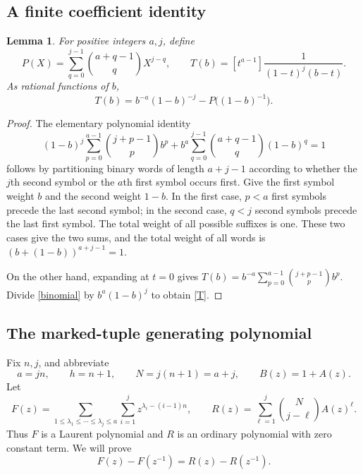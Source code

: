 \documentclass[11pt]{article}
\newtheorem{lemma}{Lemma}
\begin{document}
\subsection*{A finite coefficient identity}
\begin{lemma}\label{truncation}
For positive integers $a,j$, define
\[
 P(X)=\sum_{q=0}^{j-1}\binom{a+q-1}q X^{j-q},\qquad
 T(b)=[t^{a-1}]\frac1{(1-t)^j(b-t)}.
\]
As rational functions of $b$,
\begin{equation}\label{T}
 T(b)=b^{-a}(1-b)^{-j}-P\bigl((1-b)^{-1}\bigr).
\end{equation}
\end{lemma}
\begin{proof}
The elementary polynomial identity
\begin{equation}\label{binomial}
 (1-b)^j\sum_{p=0}^{a-1}\binom{j+p-1}p b^p
 +b^a\sum_{q=0}^{j-1}\binom{a+q-1}q(1-b)^q=1
\end{equation}
follows by partitioning binary words of length $a+j-1$ according
to whether the $j$th second symbol or the $a$th first symbol
occurs first. Give the first symbol weight $b$ and the second
weight $1-b$. In the first case, $p<a$ first symbols precede the
last second symbol; in the second case, $q<j$ second symbols
precede the last first symbol. The total weight of all possible
suffixes is one. These two cases give the two sums, and the total
weight of all words is $(b+(1-b))^{a+j-1}=1$.

On the other hand, expanding at $t=0$ gives
$T(b)=b^{-a}\sum_{p=0}^{a-1}\binom{j+p-1}p b^p$.
Divide \eqref{binomial} by $b^a(1-b)^j$ to obtain \eqref{T}.
\end{proof}

\subsection*{The marked-tuple generating polynomial}
Fix $n,j$, and abbreviate
\[
 a=jn,\qquad h=n+1,\qquad N=j(n+1)=a+j,\qquad
 B(z)=1+A(z).
\]
Let
\[
 F(z)=\sum_{1\leq\lambda_1\leq\cdots\leq\lambda_j\leq a}
             \sum_{i=1}^j z^{\lambda_i-(i-1)n},\qquad
 R(z)=\sum_{\ell=1}^j\binom N{j-\ell}A(z)^\ell.
\]
Thus $F$ is a Laurent polynomial and $R$ is an ordinary
polynomial with zero constant term. We will prove
\begin{equation}\label{Laurent}
 F(z)-F(z^{-1})=R(z)-R(z^{-1}).
\end{equation}
\end{document}
